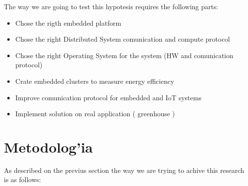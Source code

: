 The way we are going to test this hypotesis requires the following parts:


\begin{itemize}
\item Chose the rigth embedded platform 
\item Chose the right Distributed System comunication and compute protocol
\item Chose the right Operating System for the system (HW and comunication protocol) 
\item Crate embedded clusters to measure energy efficiency
\item Improve comunication protocol for embedded and IoT systems
\item Implement solution on real application ( greenhouse )
\end{itemize}

\section{Metodolog'ia}
\noindent

As described on the previus section the way we are trying to achive this
research is as follows: 


